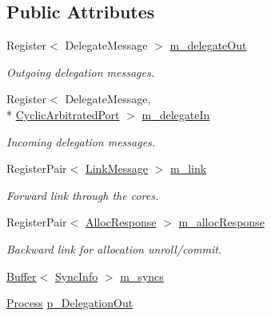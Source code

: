 \subsection*{Public Attributes}
\begin{DoxyCompactItemize}
\item 
Register$<$ Delegate\+Message $>$ \hyperlink{class_simulator_1_1drisc_1_1_network_a05f8e1a534e761cde43203c1ff12ffdc}{m\+\_\+delegate\+Out}
\begin{DoxyCompactList}\small\item\em Outgoing delegation messages. \end{DoxyCompactList}\item 
Register$<$ Delegate\+Message, \\*
\hyperlink{class_simulator_1_1_cyclic_arbitrated_port}{Cyclic\+Arbitrated\+Port} $>$ \hyperlink{class_simulator_1_1drisc_1_1_network_ae0dd43a086bf345947dc0fdfaebe5da4}{m\+\_\+delegate\+In}
\begin{DoxyCompactList}\small\item\em Incoming delegation messages. \end{DoxyCompactList}\item 
Register\+Pair$<$ \hyperlink{struct_simulator_1_1drisc_1_1_link_message}{Link\+Message} $>$ \hyperlink{class_simulator_1_1drisc_1_1_network_ab1b03a347b36fa3b13dccb4b0de6ab32}{m\+\_\+link}
\begin{DoxyCompactList}\small\item\em Forward link through the cores. \end{DoxyCompactList}\item 
Register\+Pair$<$ \hyperlink{struct_simulator_1_1drisc_1_1_alloc_response}{Alloc\+Response} $>$ \hyperlink{class_simulator_1_1drisc_1_1_network_a642e45336ed4f3010df7413c072b5a16}{m\+\_\+alloc\+Response}
\begin{DoxyCompactList}\small\item\em Backward link for allocation unroll/commit. \end{DoxyCompactList}\item 
\hyperlink{class_simulator_1_1_buffer}{Buffer}$<$ \hyperlink{struct_simulator_1_1drisc_1_1_network_1_1_sync_info}{Sync\+Info} $>$ \hyperlink{class_simulator_1_1drisc_1_1_network_a521f924b9fe901334f5d31a909db55c9}{m\+\_\+syncs}
\item 
\hyperlink{class_simulator_1_1_process}{Process} \hyperlink{class_simulator_1_1drisc_1_1_network_afd0825555f2a46b32bcc32cc8b98edef}{p\+\_\+\+Delegation\+Out}
\item 

\end{DoxyCompactItemize}
